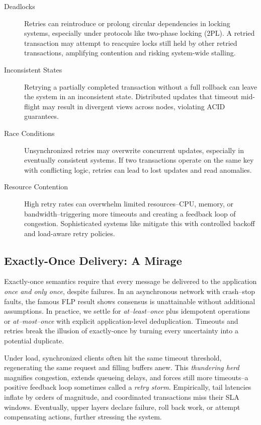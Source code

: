 \documentclass[../../../OAE-SPEC-MAIN.tex]{subfiles}
\begin{document}
\begin{description}

  \item[Deadlocks]  
  Retries can reintroduce or prolong circular dependencies in locking systems, especially under protocols like two-phase locking (2PL). A retried transaction may attempt to reacquire locks still held by other retried transactions, amplifying contention and risking system-wide stalling.

  \item[Inconsistent States]  
  Retrying a partially completed transaction without a full rollback can leave the system in an inconsistent state. Distributed updates that timeout mid-flight may result in divergent views across nodes, violating ACID guarantees.

  \item[Race Conditions]  
  Unsynchronized retries may overwrite concurrent updates, especially in eventually consistent systems. If two transactions operate on the same key with conflicting logic, retries can lead to lost updates and read anomalies.

  \item[Resource Contention]  
  High retry rates can overwhelm limited resources--CPU, memory, or bandwidth--triggering more timeouts and creating a feedback loop of congestion. Sophisticated systems like \cite{GoogleSpanner2012} mitigate this with controlled backoff and load-aware retry policies.

\end{description}


\subsection*{Exactly-Once Delivery: A Mirage}

Exactly-once semantics require that every message be delivered to the application \emph{once and only once}, despite failures.  In an asynchronous network with crash--stop faults, the famous FLP result shows consensus is unattainable without additional assumptions.  In practice, we settle for \emph{at--least--once} plus idempotent operations or \emph{at--most--once} with explicit application-level deduplication.  Timeouts and retries break the illusion of exactly-once by turning every uncertainty into a potential duplicate.

Under load, synchronized clients often hit the same timeout threshold, regenerating the same request and filling buffers anew.  This \emph{thundering herd} magnifies congestion, extends queueing delays, and forces still more timeouts--a positive feedback loop sometimes called a \emph{retry storm}.  Empirically, tail latencies inflate by orders of magnitude, and coordinated transactions miss their SLA windows. Eventually, upper layers declare failure, roll back work, or attempt compensating actions, further stressing the system.
\end{document}
